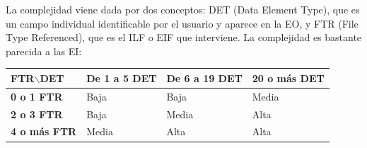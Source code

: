 \documentclass[spanish,a4paper,11pt, twoside]{report}	%
\begin{document}
	La complejidad viene dada por dos conceptos: DET (Data Element Type), que es un campo individual identificable por el usuario y aparece en la EO, y FTR (File Type Referenced), que es el ILF o EIF que interviene. La complejidad es bastante parecida a las EI: 

\vspace{0.35cm}

			\begin{tabular}{|p{3cm}||p{3cm}|p{3.2cm}|p{3cm}|}
				\hline
				\textbf{FTR$\backslash$DET} & \textbf{De 1 a 5 DET} & \textbf{De 6 a 19 DET} & \textbf{20  o más DET} \\ \hline \hline
				\textbf{0 o 1 FTR} & Baja & Baja & Media \\ \hline 
				\textbf{2 o 3 FTR} & Baja & Media & Alta \\ \hline 
				\textbf{4 o más FTR} & Media & Alta & Alta \\ \hline 
			\end{tabular}

\vspace{0.35cm}
\end{document}

